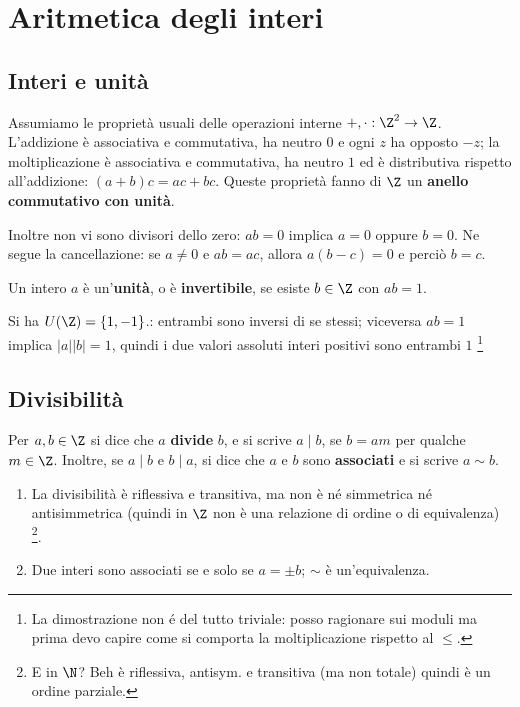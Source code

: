 \chapter{Aritmetica degli interi}\label{cap:interi}

\section{Interi e unità}
Assumiamo le proprietà usuali delle operazioni interne $+,\cdot:\Z^2\to\Z$. L'addizione è associativa e commutativa, ha neutro $0$ e ogni $z$ ha opposto $-z$; la moltiplicazione è associativa e commutativa, ha neutro $1$ ed è distributiva rispetto all'addizione: $(a+b)c=ac+bc$. Queste proprietà fanno di $\Z$ un \textbf{anello commutativo con unità}.

Inoltre non vi sono divisori dello zero: $ab=0$ implica $a=0$ oppure $b=0$. Ne segue la cancellazione: se $a\ne0$ e $ab=ac$, allora $a(b-c)=0$ e perciò $b=c$.

\begin{definizione}
Un intero $a$ è un'\textbf{unità}, o è \textbf{invertibile}, se esiste $b\in\Z$ con $ab=1$.
\end{definizione}

Si ha $U(\Z)=\{1,-1\}$.: entrambi sono inversi di se stessi; viceversa $ab=1$ implica $|a||b|=1$, quindi i due valori assoluti interi positivi sono entrambi $1$ \footnote{La dimostrazione non é del tutto triviale: posso ragionare sui moduli ma prima devo capire come si comporta la moltiplicazione rispetto al $\leq$.}

\section{Divisibilità}
\begin{definizione}
Per $a,b\in\Z$ si dice che $a$ \textbf{divide} $b$, e si scrive $a\mid b$, se $b=am$ per qualche $m\in\Z$. Inoltre, se $a\mid b$ e $b\mid a$, si dice che $a$ e $b$ sono \textbf{associati} e si scrive $a\sim b$.
\end{definizione}

\begin{proposizione}
\begin{enumerate}[label=\arabic*.]
\item La divisibilità è riflessiva e transitiva, ma non è né simmetrica né antisimmetrica (quindi in $\Z$ non è una relazione di ordine o di equivalenza) \footnote{E in $\N$? Beh è riflessiva, antisym. e transitiva (ma non totale) quindi è un ordine parziale.}.
\item Due interi sono associati se e solo se $a=\pm b$; $\sim$ è un'equivalenza.
\end{enumerate}
\end{proposizione}


